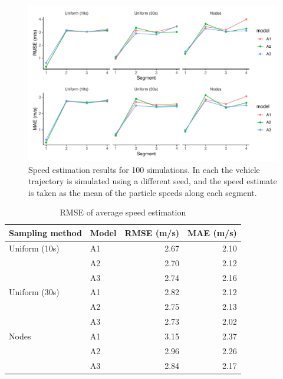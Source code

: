 \begin{knitrout}\small
{}\color{fgcolor}\begin{figure}
\includegraphics[width=\maxwidth]{figure/sim3_pf_full-1} \caption[Speed estimation results for 100 simulations]{Speed estimation results for 100 simulations. In each the vehicle trajectory is simulated using a different seed, and the speed estimate is taken as the mean of the particle speeds along each segment.}\label{fig:sim3_pf_full}
\end{figure}

\begin{table}

\caption{\label{tab:sim3_pf_full}RMSE of average speed estimation}
\centering
\fontsize{8}{10}\selectfont
\begin{tabular}[t]{llrr}
\toprule
Sampling method & Model & RMSE (m/s) & MAE (m/s)\\
\midrule
Uniform (10s) & A1 & 2.67 & 2.10\\
 & A2 & 2.70 & 2.12\\
 & A3 & 2.74 & 2.16\\
\midrule
Uniform (30s) & A1 & 2.82 & 2.12\\
 & A2 & 2.75 & 2.13\\
 & A3 & 2.73 & 2.02\\
\midrule
Nodes & A1 & 3.15 & 2.37\\
 & A2 & 2.96 & 2.26\\
 & A3 & 2.84 & 2.17\\
\bottomrule
\end{tabular}
\end{table}


\end{knitrout}
